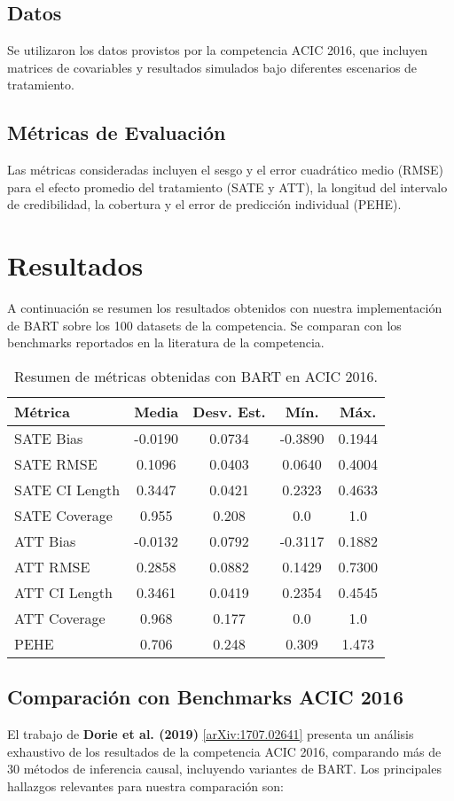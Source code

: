 \documentclass[a4paper,12pt]{article}
\begin{document}
\subsection{Datos}
Se utilizaron los datos provistos por la competencia ACIC 2016, que incluyen matrices de covariables y resultados simulados bajo diferentes escenarios de tratamiento.

\subsection{Métricas de Evaluación}
Las métricas consideradas incluyen el sesgo y el error cuadrático medio (RMSE) para el efecto promedio del tratamiento (SATE y ATT), la longitud del intervalo de credibilidad, la cobertura y el error de predicción individual (PEHE).

\section{Resultados}
A continuación se resumen los resultados obtenidos con nuestra implementación de BART sobre los 100 datasets de la competencia. Se comparan con los benchmarks reportados en la literatura de la competencia.

\begin{table}[h!]
\centering
\begin{tabular}{lcccc}
\toprule
Métrica & Media & Desv. Est. & Mín. & Máx. \\
\midrule
SATE Bias & -0.0190 & 0.0734 & -0.3890 & 0.1944 \\
SATE RMSE & 0.1096 & 0.0403 & 0.0640 & 0.4004 \\
SATE CI Length & 0.3447 & 0.0421 & 0.2323 & 0.4633 \\
SATE Coverage & 0.955 & 0.208 & 0.0 & 1.0 \\
ATT Bias & -0.0132 & 0.0792 & -0.3117 & 0.1882 \\
ATT RMSE & 0.2858 & 0.0882 & 0.1429 & 0.7300 \\
ATT CI Length & 0.3461 & 0.0419 & 0.2354 & 0.4545 \\
ATT Coverage & 0.968 & 0.177 & 0.0 & 1.0 \\
PEHE & 0.706 & 0.248 & 0.309 & 1.473 \\
\bottomrule
\end{tabular}
\caption{Resumen de métricas obtenidas con BART en ACIC 2016.}
\end{table}

\subsection{Comparación con Benchmarks ACIC 2016}
El trabajo de \textbf{Dorie et al. (2019)} \cite{dorie2019automated} \href{https://arxiv.org/abs/1707.02641}{[arXiv:1707.02641]} presenta un análisis exhaustivo de los resultados de la competencia ACIC 2016, comparando más de 30 métodos de inferencia causal, incluyendo variantes de BART. Los principales hallazgos relevantes para nuestra comparación son:
\end{document}

